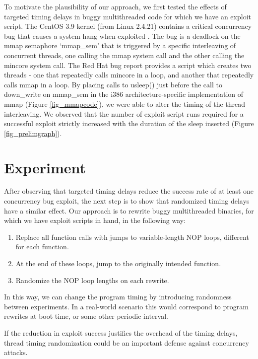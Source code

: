 \documentclass[12pt,conference]{IEEEtran}
\begin{document}
To motivate the plausibility of our approach, we first tested the effects of targeted timing delays in buggy multithreaded code for which we have an exploit script.  The CentOS 3.9 kernel (from Linux 2.4.21) contains a critical concurrency bug that causes a system hang when exploited \cite{CVE2006-4814}.  The bug is a deadlock on the mmap semaphore `mmap\_sem' that is triggered by a specific interleaving of concurrent threads, one calling the mmap system call and the other calling the mincore system call.  The Red Hat bug report \cite{RHELbug180663} provides a script which creates two threads - one that repeatedly calls mincore in a loop, and another that repeatedly calls mmap in a loop.  By placing calls to usleep() just before the call to down\_write on mmap\_sem in the i386 architecture-specific implementation of mmap (Figure \ref{fig_mmapcode}), we were able to alter the timing of the thread interleaving.  We observed that the number of exploit script runs required for a successful exploit strictly increased with the duration of the sleep inserted (Figure \ref{fig_prelimgraph}).

\section{Experiment}
After observing that targeted timing delays reduce the success rate of at least one concurrency bug exploit, the next step is to show that randomized timing delays have a similar effect.  Our approach is to rewrite buggy multithreaded binaries, for which we have exploit scripts in hand, in the following way:
\begin{enumerate}
	\item Replace all function calls with jumps to variable-length NOP loops, different for each function.
	\item At the end of these loops, jump to the originally intended function.
	\item Randomize the NOP loop lengths on each rewrite.
\end{enumerate}
\newpage{}
In this way, we can change the program timing by introducing randomness between experiments.  In a real-world scenario this would correspond to program rewrites at boot time, or some other periodic interval.

If the reduction in exploit success justifies the overhead of the timing delays, thread timing randomization could be an important defense against concurrency attacks.
\end{document}
